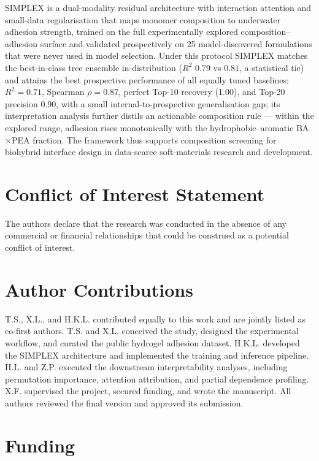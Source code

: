 \documentclass[utf8]{FrontiersinHarvard}
\begin{document}
SIMPLEX is a dual-modality residual architecture with interaction attention and small-data regularisation that maps monomer composition to underwater adhesion strength, trained on the full experimentally explored composition--adhesion surface and validated prospectively on 25 model-discovered formulations that were never used in model selection. Under this protocol SIMPLEX matches the best-in-class tree ensemble in-distribution ($R^2$ $0.79$ vs $0.81$, a statistical tie) and attains the best prospective performance of all equally tuned baselines: $R^2 = 0.71$, Spearman $\rho = 0.87$, perfect Top-10 recovery (1.00), and Top-20 precision 0.90, with a small internal-to-prospective generalisation gap; its interpretation analysis further distils an actionable composition rule --- within the explored range, adhesion rises monotonically with the hydrophobic--aromatic BA$\times$PEA fraction. The framework thus supports composition screening for biohybrid interface design in data-scarce soft-materials research and development.

\section*{Conflict of Interest Statement}

The authors declare that the research was conducted in the absence of any commercial or financial relationships that could be construed as a potential conflict of interest.

\section*{Author Contributions}

T.S., X.L., and H.K.L. contributed equally to this work and are jointly listed as co-first authors. T.S. and X.L. conceived the study, designed the experimental workflow, and curated the public hydrogel adhesion dataset. H.K.L. developed the SIMPLEX architecture and implemented the training and inference pipeline. H.L. and Z.P. executed the downstream interpretability analyses, including permutation importance, attention attribution, and partial dependence profiling. X.F. supervised the project, secured funding, and wrote the manuscript. All authors reviewed the final version and approved its submission.

\section*{Funding}
\end{document}
